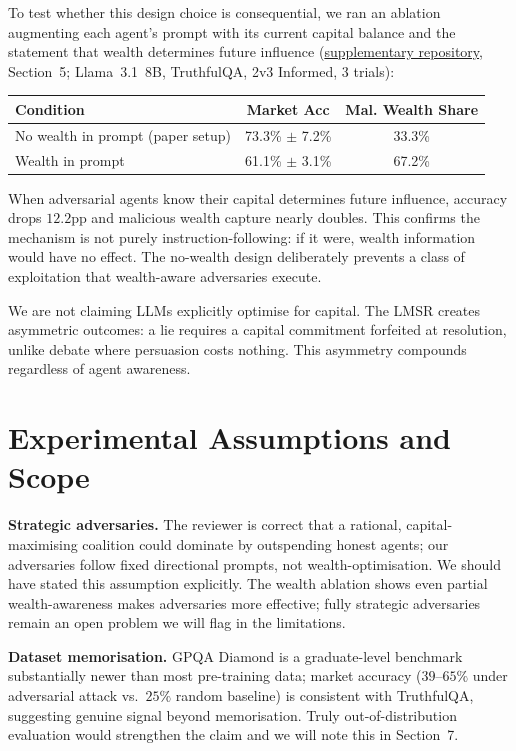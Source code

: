 \documentclass[10pt]{article}
\newcommand{\supp}{\href{[ANONYMISED\_REPO\_URL]}{supplementary repository}}
\begin{document}
To test whether this design choice is consequential, we ran an ablation
augmenting each agent's prompt with its current capital balance and the statement
that wealth determines future influence (\supp, Section~5; Llama~3.1~8B,
TruthfulQA, 2v3 Informed, 3 trials):

\begin{center}\small
\begin{tabular}{lcc}
\toprule
\textbf{Condition} & \textbf{Market Acc} & \textbf{Mal. Wealth Share} \\
\midrule
No wealth in prompt (paper setup) & 73.3\% $\pm$ 7.2\% & 33.3\% \\
Wealth in prompt                  & 61.1\% $\pm$ 3.1\% & 67.2\% \\
\bottomrule
\end{tabular}
\end{center}

When adversarial agents know their capital determines future influence, accuracy
drops $12.2$pp and malicious wealth capture nearly doubles. This confirms the
mechanism is not purely instruction-following: if it were, wealth information
would have no effect. The no-wealth design deliberately prevents a class of
exploitation that wealth-aware adversaries execute.

We are not claiming LLMs explicitly optimise for capital. The LMSR creates
asymmetric outcomes: a lie requires a capital commitment forfeited at resolution,
unlike debate where persuasion costs nothing. This asymmetry compounds regardless
of agent awareness.

\section*{Experimental Assumptions and Scope}

\textbf{Strategic adversaries.}
The reviewer is correct that a rational, capital-maximising coalition could
dominate by outspending honest agents; our adversaries follow fixed directional
prompts, not wealth-optimisation. We should have stated this assumption
explicitly. The wealth ablation shows even partial wealth-awareness makes
adversaries more effective; fully strategic adversaries remain an open problem
we will flag in the limitations.

\textbf{Dataset memorisation.}
GPQA Diamond is a graduate-level benchmark substantially newer than most
pre-training data; market accuracy ($39$--$65\%$ under adversarial attack
vs.\ $25\%$ random baseline) is consistent with TruthfulQA, suggesting genuine
signal beyond memorisation. Truly out-of-distribution evaluation would
strengthen the claim and we will note this in Section~7.
\end{document}
